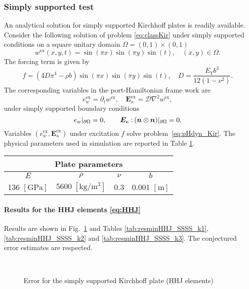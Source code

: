 \subsubsection{Simply supported test}
An analytical solution for simply supported Kirchhoff plates is readily available. Consider the following solution of problem \eqref{eq:classKir} under simply supported conditions on a square unitary domain $\Omega = (0,1)\times (0,1)$
\[
w^{\text{ex}}(x,y,t) = \sin(\pi x) \sin(\pi y) \sin(t), \quad  (x, y) \in \Omega.
\] 
The forcing term is given by  
\[
f = (4 D \pi^4 - \rho b) \sin(\pi x) \sin(\pi y) \sin(t), \quad D = \frac{E_Y b^3}{12 (1-\nu^2)}.
\]
The corresponding variables in the port-Hamiltonian frame work are
\[
e_w^{\text{ex}} = \partial_t w^{\text{ex}}, \quad \bm{E}_\kappa^{\text{ex}} = \mathcal{D} \nabla^2 w^{\text{ex}},
\]
under simply supported boundary conditions
\[
e_w\vert_{\partial\Omega} = 0, \qquad \bm{E}_\kappa \cddot (\bm{n} \otimes \bm{n})\vert_{\partial\Omega} = 0.
\]
Variables $(e_w^{\text{ex}}, \bm{E}_\kappa^{\text{ex}})$ under excitation $f$ solve problem~\eqref{eq:pHdyn_Kir}. The physical parameters used in simulation are reported in Table \ref{tab:parKir}. 

\begin{table}[h!]
	\centering
	\begin{tabular}{cccc}
		\hline 
		\multicolumn{4}{c}{Plate parameters} \\ 
		\hline 
		$E$ & $\rho$ & $\nu$  & $b$ \\
		136 $[\textrm{GPa}]$ & $5600\; [\textrm{kg}/\textrm{m}^3]$ & 0.3 &  0.001 $[\textrm{m}]$\\ 
		\hline 
	\end{tabular} 
	\captionsetup{width=0.95\linewidth}
	\vspace{1mm}
	\label{tab:parKir}
\end{table}


\paragraph{Results for the HHJ elements \eqref{eq:HHJ}}
Results are shown in Fig.~\ref{fig:errorHHJ_SSSS} and Tables \ref{tab:resminHHJ_SSSS_k1}, \ref{tab:resminHHJ_SSSS_k2} and \ref{tab:resminHHJ_SSSS_k3}. The conjectured error estimates are respected.

\begin{figure}[h!t]%
	\centering
	\hspace{8pt}%
	 \\
	\caption{Error for the simply supported Kirchhoff plate (HHJ elements)}%
	\label{fig:errorHHJ_SSSS}%
\end{figure}

